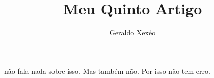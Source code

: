 \documentclass{article}
\title{Meu Quinto Artigo}
\author{Geraldo Xexéo}
\begin{document}
\maketitle
\citet{bibera2012} não fala nada sobre isso. Mas \citep{bibera2012} também não. Por isso \citep{biber:2012} não tem erro. 
\printbibliography       
\end{document}
